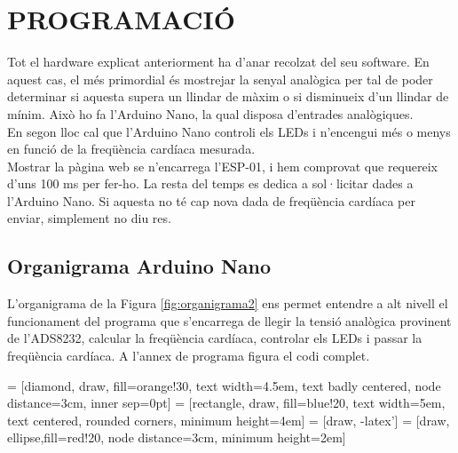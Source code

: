 \chapter{\uppercase{Programació}}
Tot el hardware explicat anteriorment ha d'anar recolzat del seu software. En aquest cas, el més primordial és mostrejar la senyal analògica per tal de poder determinar si aquesta supera un llindar de màxim o si disminueix d'un llindar de mínim. Això ho fa l'Arduino Nano, la qual disposa d'entrades analògiques.\\
\newline En segon lloc cal que l'Arduino Nano controli els LEDs i n'encengui més o menys en funció de la freqüència cardíaca mesurada.\\
\newline Mostrar la pàgina web se n'encarrega l'ESP-01, i hem comprovat que requereix d'uns 100 ms per fer-ho. La resta del temps es dedica a sol·licitar dades a l'Arduino Nano. Si aquesta no té cap nova dada de freqüència cardíaca per enviar, simplement no diu res. 


\section{Organigrama Arduino Nano}
L'organigrama de la Figura \ref{fig:organigrama2} ens permet entendre a alt nivell el funcionament del programa que s'encarrega de llegir la tensió analògica provinent de l'ADS8232, calcular la freqüència cardíaca, controlar els LEDs i passar la freqüència cardíaca. A l'annex de programa figura el codi complet.


 = [diamond, draw, fill=orange!30, 
    text width=4.5em, text badly centered, node distance=3cm, inner sep=0pt]
 = [rectangle, draw, fill=blue!20, 
    text width=5em, text centered, rounded corners, minimum height=4em]
 = [draw, -latex']
 = [draw, ellipse,fill=red!20, node distance=3cm,
    minimum height=2em]
    
